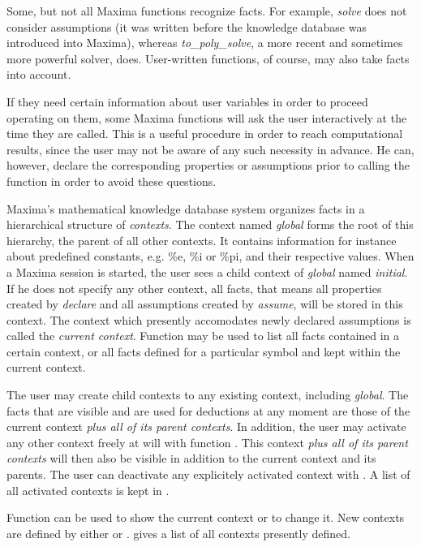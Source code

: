 \documentclass[../Maxima_Workbook.tex]{subfiles}
\begin{document}
\lz Some, but not all Maxima functions recognize facts. For example, \emph{solve} does not consider assumptions (it was written before the knowledge database was introduced into Maxima), whereas \emph{to\_poly\_solve}, a more recent and sometimes more powerful solver, does. User-written functions, of course, may also take facts into account.

\lz If they need certain information about user variables in order to proceed operating on them, some Maxima functions will ask the user interactively at the time they are called. This is a useful procedure in order to reach computational results, since the user may not be aware of any such necessity in advance. He can, however, declare the corresponding properties or assumptions prior to calling the function in order to avoid these questions.

\lz Maxima's mathematical knowledge database system organizes facts in a hierarchical structure of \emph{contexts}. The context named \emph{global} forms the root of this hierarchy, the parent of all other contexts. It contains information for instance about predefined constants, e.g. \%e, \%i or \%pi, and their respective values. When a Maxima session is started, the user sees a child context of \emph{global} named \emph{initial}. If he does not specify any other context, all facts, that means all properties created by \emph{declare} and all assumptions created by \emph{assume}, will be stored in this context. The context which presently accomodates newly declared assumptions is called the \emph{current context}. Function  may be used to list all facts contained in a certain context, or all facts defined for a particular symbol and kept within the current context.

\lz The user may create child contexts to any existing context, including \emph{global}. The facts that are visible and are used for deductions at any moment are those of the current context \emph{plus all of its parent contexts}. In addition, the user may activate any other context freely at will with function . This context \emph{plus all of its parent contexts} will then also be visible in addition to the current context and its parents. The user can deactivate any explicitely activated context with . A list of all activated contexts is kept in .

\lz Function  can be used to show the current context or to change it. New contexts are defined by either  or .  gives a list of all contexts presently defined.
\end{document}
